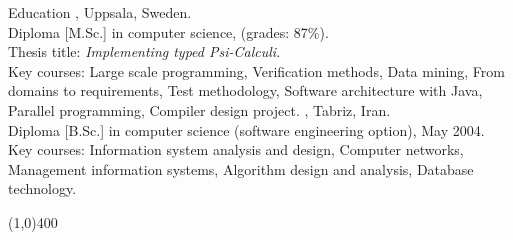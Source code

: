 \documentclass{resume}
\author{Amin Khorsandiaghai}
\begin{document}
\maketitle

\begin{category}{Education}
, Uppsala, Sweden. \\
Diploma [M.Sc.] in computer science, (grades: 87\%).\\
Thesis title: {\em Implementing typed Psi-Calculi.}\\
Key courses: Large scale programming, Verification methods, Data mining, 
From domains to requirements, Test methodology,
Software architecture with Java, Parallel programming, Compiler design project. 
, Tabriz, Iran.\\
Diploma [B.Sc.] in computer science (software engineering option), May 2004.\\
Key courses: Information system analysis and design, Computer networks, 
Management information systems, Algorithm design and analysis, Database technology.
\end{category}

\begin{center}
\line(1,0){400}
\end{center}

\end{document}
